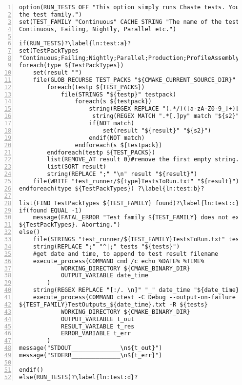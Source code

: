 \documentclass[10pt,a4paper]{article}
\begin{document}
\begin{codeparchment}
\begin{lstlisting}[numbers=left]
option(RUN_TESTS OFF "This option simply runs Chaste tests. You should also set
the test family.")
set(TEST_FAMILY "Continuous" CACHE STRING "The name of the test family, e.g,
Continuous, Failing, Nightly, Parallel etc.")

if(RUN_TESTS)?\label{ln:test:a}?
set(TestPackTypes
"Continuous;Failing;Nightly;Parallel;Production;ProfileAssembly;Profile")
foreach(type ${TestPackTypes})
	set(result "")
	file(GLOB_RECURSE TEST_PACKS "${CMAKE_CURRENT_SOURCE_DIR}" ${type}TestPack.txt)
		foreach(testp ${TEST_PACKS})
			file(STRINGS "${testp}" testpack)
				foreach(s ${testpack})
					string(REGEX REPLACE "(.*/)([a-zA-Z0-9_]+)[.]hpp" "\\2" s2 "${s}")
					 string(REGEX MATCH ".*[.]py" match "${s2}")
					if(NOT match)
						set(result "${result}" "${s2}")
					endif(NOT match)
				endforeach(s ${testpack})
		endforeach(testp ${TEST_PACKS})
		list(REMOVE_AT result 0)#remove the first empty string.
		list(SORT result)
		string(REPLACE ";" "\n" result "${result}")
	file(WRITE "test_runner/${type}TestsToRun.txt" "${result}") 
endforeach(type ${TestPackTypes}) ?\label{ln:test:b}?

list(FIND TestPackTypes ${TEST_FAMILY} found)?\label{ln:test:c}?
if(found EQUAL -1)
	message(FATAL_ERROR "Test family ${TEST_FAMILY} does not exist. Must be one of
${TestPackTypes}. Aborting.")
else()
	file(STRINGS "test_runner/${TEST_FAMILY}TestsToRun.txt" tests)
	string(REPLACE ";" "^|;" tests "${tests}")
	#get date and time, to append to test result filename
	execute_process(COMMAND cmd /c echo %DATE% %TIME%
			WORKING_DIRECTORY ${CMAKE_BINARY_DIR}
			OUTPUT_VARIABLE date_time
		)
	string(REGEX REPLACE "[:/. \n]" "_" date_time "${date_time}")
	execute_process(COMMAND ctest -C Debug --output-on-failure -O
${TEST_FAMILY}TestOutputs_${date_time}.txt -R ${tests}
			WORKING_DIRECTORY ${CMAKE_BINARY_DIR}
			OUTPUT_VARIABLE t_out
			RESULT_VARIABLE t_res
			ERROR_VARIABLE t_err
		)
message("STDOUT______________\n${t_out}")
message("STDERR______________\n${t_err}")

endif()
else(RUN_TESTS)?\label{ln:test:d}?
\end{lstlisting}
\end{codeparchment}
\end{document}
